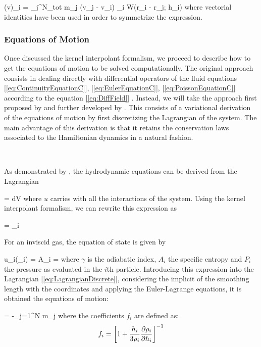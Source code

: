 \documentclass[a4,useAMS,usenatbib,usegraphicx,12pt]{article}
\begin{document}
{ (\nabla \cdot \bds v)_i = \sum_j^{N_{tot}} m_j (\bds v_j - \bds v_i)
\cdot \nabla_i W(\bds r_i - \bds r_j; h_i) }
where vectorial identities have been used in order to symmetrize the expression.

\subsubsection*{Equations of Motion}

Once discussed the kernel interpolant formalism, we proceed to describe how to
get the equations of motion to be solved computationally. The original approach
consists in dealing directly with differential operators of the fluid equations 
[\ref{eq:ContinuityEquationC}], [\ref{eq:EulerEquationC}], 
[\ref{eq:PoissonEquationC}] according to the equation [\ref{eq:DiffField}] 
\citep{Lucy77,Gingold77}. Instead, we will take the approach first proposed by 
\citet{Gingold82} and further developed by \citet{Springel11}. This consists of 
a variational derivation of the equations of motion by first discretizing the 
Lagrangian of the system. The main advantage of this derivation is that it 
retains the conservation laws associated to the Hamiltonian dynamics in a 
natural fashion.

\

As demonstrated by \citet{Eckart60}, the hydrodynamic equations can be derived
from the Lagrangian

{  = \int \rho {}dV }
where $u$ carries with all the interactions of the system. Using the kernel 
interpolant formalism, we can rewrite this expression as

{  = \sum_i  }

For an inviscid gas, the equation of state is given by

{ u_i(\rho_i) = A_i = 
 }
where $\gamma$ is the adiabatic index, $A_i$ the specific entropy and $P_i$ the
pressure as evaluated in the $i$th particle. Introducing this expression into
the Lagrangian [\ref{eq:LagrangianDiscrete}], considering the implicit of the
smoothing length with the coordinates and applying the Euler-Lagrange equations,
it is obtained the equations of motion:

{ = -\sum_{j=1}^N m_j  }
where the coefficients $f_i$ are defined as:
\[ f_i = \left[  1+\frac{h_i}{3\rho_i}\frac{\partial \rho_i}{\partial h_i}  \right]^{-1} \]
\end{document}
